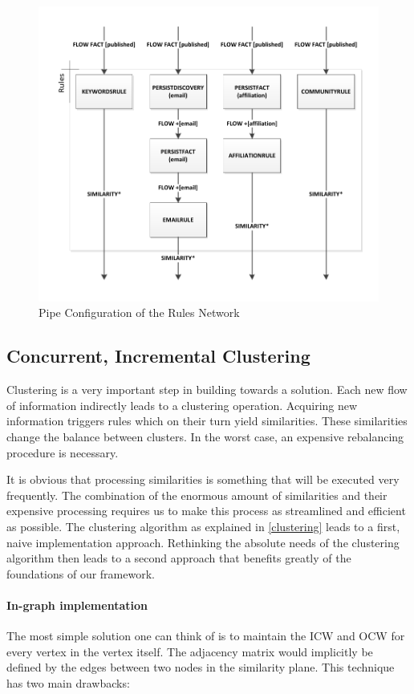 \begin{figure}[htb]
	\centering
		\includegraphics[width=1\textwidth]{fig/rulespipe}
	\caption{Pipe Configuration of the Rules Network}
	\label{fig:rulespipe}
\end{figure}

\subsection{Concurrent, Incremental Clustering}

Clustering is a very important step in building towards a solution. Each new flow of information indirectly leads to a clustering operation. Acquiring new information triggers rules which on their turn yield similarities. These similarities change the balance between clusters. In the worst case, an expensive rebalancing procedure is necessary.

It is obvious that processing similarities is something that will be executed very frequently. The combination of the enormous amount of similarities and their expensive processing requires us to make this process as streamlined and efficient as possible. The clustering algorithm as explained in \autoref{clustering} leads to a first, naive implementation approach. Rethinking the absolute needs of the clustering algorithm then leads to a second approach that benefits greatly of the foundations of our framework.

\paragraph{In-graph implementation} The most simple solution one can think of is to maintain the ICW and OCW for every vertex in the vertex itself. The adjacency matrix would implicitly be defined by the edges between two nodes in the similarity plane. This technique has two main drawbacks:

